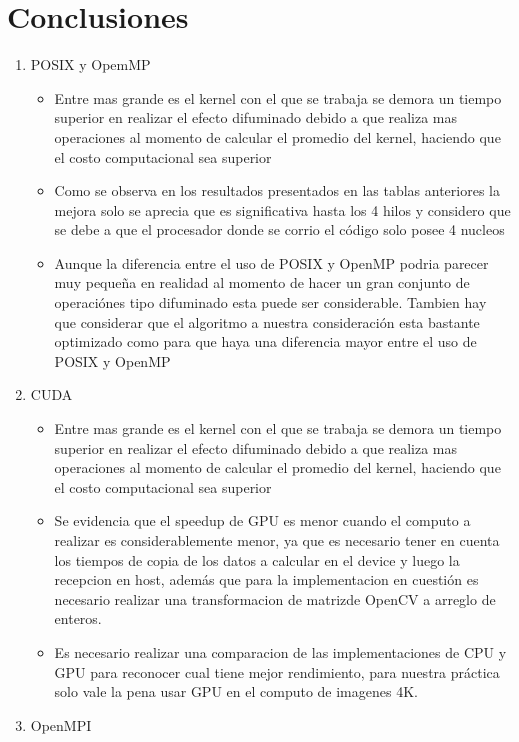 \documentclass{IEEEtran}
\begin{document}
\section{Conclusiones}
\begin{enumerate}
    \item POSIX y OpemMP
            \begin{itemize}
          \item Entre mas grande es el kernel con el que se trabaja se demora un tiempo superior en realizar el efecto difuminado debido a que realiza mas operaciones al momento de calcular el promedio del kernel, haciendo que el costo computacional sea superior
          \item Como se observa en los resultados presentados en las tablas anteriores la mejora solo se aprecia que es significativa hasta los 4 hilos y considero que se debe a que el procesador donde se corrio el código  solo posee 4
          nucleos
          \item Aunque la diferencia entre el uso de POSIX y OpenMP podria parecer muy pequeña en realidad al momento de hacer un gran conjunto de  operaciónes tipo  difuminado esta puede ser considerable. Tambien hay que considerar que el algoritmo a nuestra consideración esta bastante optimizado como para que haya una diferencia mayor entre el uso de POSIX y OpenMP
        \end{itemize}
         
    \item CUDA
    
         \begin{itemize}
          \item Entre mas grande es el kernel con el que se trabaja se demora un tiempo superior en realizar el efecto difuminado debido a que realiza mas operaciones al momento de calcular el promedio del kernel, haciendo que el costo computacional sea superior
          \item Se evidencia que el speedup de GPU es menor cuando el computo a realizar es considerablemente menor, ya que es necesario tener en cuenta los tiempos de copia de los datos a calcular en el device y luego la recepcion en host, además que para la implementacion en cuestión es necesario realizar una transformacion de matrizde OpenCV a arreglo de enteros.
          \item Es necesario realizar una comparacion de las implementaciones de CPU y GPU para reconocer cual tiene mejor rendimiento, para nuestra práctica solo vale la pena usar GPU en el computo de imagenes 4K.
        \end{itemize} 
    \item OpenMPI
\end{enumerate}
\end{document}
